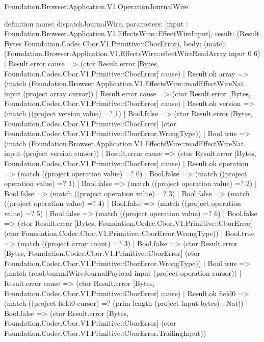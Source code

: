 \begin{lexlean}{Foundation.Browser.Application.V1.OperationJournalWire}
\begin{semanticmodule}
definition{
  name: dispatchJournalWire,
  parameters: [input : Foundation.Browser.Application.V1.EffectsWire::EffectWireInput],
  result: (Result Bytes Foundation.Codec.Cbor.V1.Primitive::CborError),
  body: (match (Foundation.Browser.Application.V1.EffectsWire::effectWireReadArray input 0 6)
    | Result.error cause => (ctor Result.error [Bytes, Foundation.Codec.Cbor.V1.Primitive::CborError] cause)
    | Result.ok array => (match (Foundation.Browser.Application.V1.EffectsWire::readEffectWireNat input (project array cursor))
      | Result.error cause => (ctor Result.error [Bytes, Foundation.Codec.Cbor.V1.Primitive::CborError] cause)
      | Result.ok version => (match ((project version value) =? 1)
        | Bool.false => (ctor Result.error [Bytes, Foundation.Codec.Cbor.V1.Primitive::CborError] (ctor Foundation.Codec.Cbor.V1.Primitive::CborError.WrongType))
        | Bool.true => (match (Foundation.Browser.Application.V1.EffectsWire::readEffectWireNat input (project version cursor))
          | Result.error cause => (ctor Result.error [Bytes, Foundation.Codec.Cbor.V1.Primitive::CborError] cause)
          | Result.ok operation => (match ((project operation value) =? 0)
            | Bool.false => (match ((project operation value) =? 1)
              | Bool.false => (match ((project operation value) =? 2)
                | Bool.false => (match ((project operation value) =? 3)
                  | Bool.false => (match ((project operation value) =? 4)
                    | Bool.false => (match ((project operation value) =? 5)
                      | Bool.false => (match ((project operation value) =? 6)
                        | Bool.false => (ctor Result.error [Bytes, Foundation.Codec.Cbor.V1.Primitive::CborError] (ctor Foundation.Codec.Cbor.V1.Primitive::CborError.WrongType))
                        | Bool.true => (match ((project array count) =? 3)
                          | Bool.false => (ctor Result.error [Bytes, Foundation.Codec.Cbor.V1.Primitive::CborError] (ctor Foundation.Codec.Cbor.V1.Primitive::CborError.WrongType))
                          | Bool.true => (match (readJournalWireJournalPayload input (project operation cursor))
                            | Result.error cause => (ctor Result.error [Bytes, Foundation.Codec.Cbor.V1.Primitive::CborError] cause)
                            | Result.ok field0 => (match ((project field0 cursor) =? (prim length (project input bytes) : Nat))
                              | Bool.false => (ctor Result.error [Bytes, Foundation.Codec.Cbor.V1.Primitive::CborError] (ctor Foundation.Codec.Cbor.V1.Primitive::CborError.TrailingInput))
}
\end{semanticmodule}
\end{lexlean}
